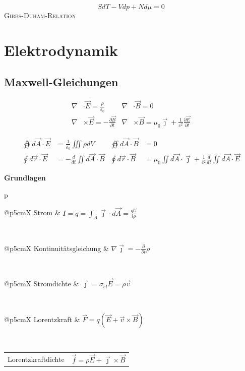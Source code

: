 \documentclass[12pt,a4paper, twoside]{article}
\makeatletter
\renewcommand{\d}[2]{\frac{d #1}{d #2}}
\newcommand{\pd}[2]{\frac{\partial #1}{\partial #2}}
\renewcommand{\=}[1]{\stackrel{#1}{=}}
\newcommand{\js}{\vec \jmath}
\newcommand{\eps}{\varepsilon}
\theoremstyle{definition}
\theoremstyle{remark}
\newcommand{\concept}[2]{%
\noindent
\begin{framed}
\noindent\textbf{#1}
\par\begin{tabular}{p{\linewidth}}
#2
\end{tabular}
\end{framed}
}
\newcommand{\f}[2]{%
\noindent\begin{tabularx}{\linewidth}{@{}p{5cm}X}
#1 & $#2$
\end{tabularx}}
\makeatother
\begin{document}
\begin{center}
\begin{framed}
$$S dT - V dp + N d\mu = 0$$
\centering\textsc{Gibbs-Duham-Relation}
\end{framed}
\end{center}


\newpage
\section{Elektrodynamik}

\subsection{Maxwell-Gleichungen}

\begin{center}
\begin{framed}
\begin{align*}
\nabla & \cdot \vec E = \frac{\rho}{\varepsilon_0} & \nabla & \cdot \vec B = 0\\
\nabla &\times \vec E = - \pd{\vec{B}}{t} & \nabla & \times \vec B =  \mu_0 \vec \jmath + \frac{1}{c^2} \pd{\vec{E}}{t}
\end{align*}
\end{framed}
\end{center}

\begin{center}
\begin{framed}
\begin{align*}
\oiint d\vec A \cdot \vec E &= \frac{1}{\eps_0}\iiint \rho dV & \oiint d\vec A \cdot \vec B &= 0\\
\oint d\vec r \cdot \vec E &= - \d{}{t} \iint d\vec A \cdot \vec{B} & \oint d\vec r \cdot \vec B &= \mu_0 \iint d\vec A \cdot \js + \frac{1}{c^2} \d{}{t} \iint d\vec A \cdot \vec{E}
\end{align*}
\end{framed}
\end{center}

\concept{Grundlagen}{

\f{Strom}{I = \dot{q} = \int_A \vec{\jmath} \cdot d\vec{A} = \frac{q U}{l \rho}}\\
\f{Kontinuitätsgleichung}{\nabla \vec{\jmath} = -\pd{}{t} \rho}\\
\f{Stromdichte}{\vec{\jmath} = \sigma_{el} \vec{E} = \rho \vec{v}}\\
\f{Lorentzkraft}{\vec F = q(\vec E + \vec v \times \vec B)}\\
\f{Lorentzkraftdichte}{\vec f = \rho \vec E + \vec \jmath \times \vec B}
}
\end{document}
